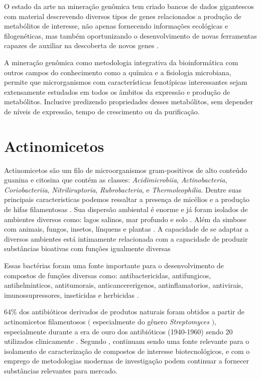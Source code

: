O estado da arte na mineração genômica tem criado bancos de dados gigantescos
com material descrevendo diversos tipos de genes relacionados a produção de metabólitos
de interesse, não apenas fornecendo informações ecológicas e filogenéticas, mas também oportunizando
o desenvolvimento de novas ferramentas capazes de auxiliar na descoberta de novos genes \cite{chevrette2021confluence}.

A mineração genômica como metodologia integrativa da bioinformática com outros campos
do conhecimento como a química e a fisiologia microbiana, permite que microrganismos com características
fenotípicas interessantes sejam extensamente estudados em todos os âmbitos da expressão e produção
de metabólitos. Inclusive predizendo propriedades desses metabólitos, sem depender de níveis de expressão,
tempo de crescimento ou da purificação. \cite{bauman2021genome, baltz2021genome}

\section{Actinomicetos}

Actinomicetos são um filo de microorganismos gram-positivos de alto conteúdo
guanina e citosina que contém as classes: \textit{Acidimicrobiia}, \textit{Actinobacteria}, 
\textit{Coriobacteriia}, \textit{Nitriliruptoria}, \textit{Rubrobacteria}, e \textit{Thermoleophilia}\cite{yadav2018}.
Dentre suas principais caracteristicas podemos ressaltar a presença de micélios
e a produção de hifas filamentosas \cite{chater2016}. Sua dispersão ambiental é enorme
e já foram isolados de ambientes diversos como: lagos salinos, mar profundo e solo \cite{flores2021,felicio2021,sapkota2020}.
Além da simbose com animais, fungos, insetos, línquens e plantas \cite{hei2021,van2017}.
A capacidade de se adaptar a diversos ambientes está intimamente relacionada com a capacidade
de produzir substâncias bioativas com funções igualmente diversas  \cite{van2020}

Essas bactérias foram uma fonte importante para o desenvolvimento de compostos de funções
diversas como: antibactericidas, antifungicos, antihelminticos, antitumorais, anticancererigenos,
antinflamatorios, antivirais, imunossupressores, inseticidas e herbicidas \cite{demain2009,jose2021}. 

64\% dos antibióticos derivados de produtos naturais foram obtidos a partir de actinomicetos filamentosos $($ especialmente do gênero \textit{Streptomyces} $)$,
especialmente durante a era de ouro dos antibióticos (1940-1960) sendo 20 utilizados clinicamente \cite{hutchings2019}.
Segundo , continuam sendo uma fonte relevante
para o isolamento de caracterização de compostos de interesse biotecnológicos, e com o
emprego de metodologias modernas de investigação podem continuar a fornecer
substâncias relevantes para mercado. 


